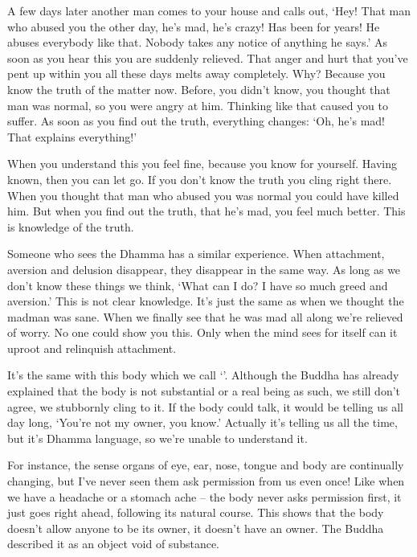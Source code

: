 A few days later another man comes to your house and calls out, `Hey! That man who abused you the other day, he's mad, he's crazy! Has been for years! He abuses everybody like that. Nobody takes any notice of anything he says.' As soon as you hear this you are suddenly relieved. That anger and hurt that you've pent up within you all these days melts away completely. Why? Because you know the truth of the matter now. Before, you didn't know, you thought that man was normal, so you were angry at him. Thinking like that caused you to suffer. As soon as you find out the truth, everything changes: `Oh, he's mad! That explains everything!' 

When you understand this you feel fine, because you know for yourself. Having known, then you can let go. If you don't know the truth you cling right there. When you thought that man who abused you was normal you could have killed him. But when you find out the truth, that he's mad, you feel much better. This is knowledge of the truth. 

Someone who sees the Dhamma has a similar experience. When attachment, aversion and delusion disappear, they disappear in the same way. As long as we don't know these things we think, `What can I do? I have so much greed and aversion.' This is not clear knowledge. It's just the same as when we thought the madman was sane. When we finally see that he was mad all along we're relieved of worry. No one could show you this. Only when the mind sees for itself can it uproot and relinquish attachment. 

It's the same with this body which we call `'. Although the Buddha has already explained that the body is not substantial or a real being as such, we still don't agree, we stubbornly cling to it. If the body could talk, it would be telling us all day long, `You're not my owner, you know.' Actually it's telling us all the time, but it's Dhamma language, so we're unable to understand it. 

For instance, the sense organs of eye, ear, nose, tongue and body are continually changing, but I've never seen them ask permission from us even once! Like when we have a headache or a stomach ache -- the body never asks permission first, it just goes right ahead, following its natural course. This shows that the body doesn't allow anyone to be its owner, it doesn't have an owner. The Buddha described it as an object void of substance. 


